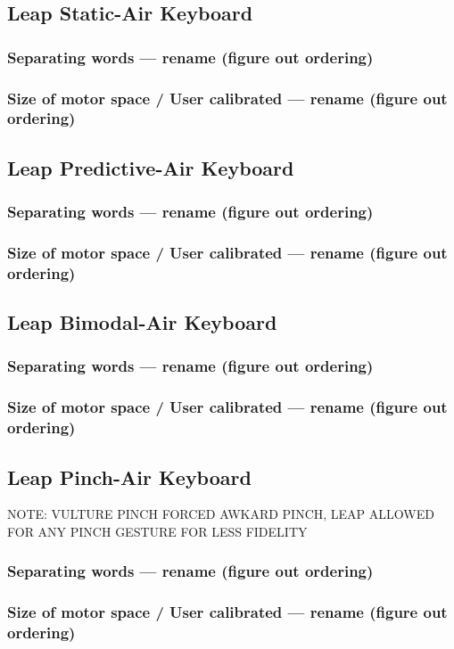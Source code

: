 \subsection{Leap Static-Air Keyboard}

\subsubsection{Separating words --- rename (figure out ordering)}

\subsubsection{Size of motor space / User calibrated --- rename (figure out ordering)}




\subsection{Leap Predictive-Air Keyboard}

\subsubsection{Separating words --- rename (figure out ordering)}

\subsubsection{Size of motor space / User calibrated --- rename (figure out ordering)}




\subsection{Leap Bimodal-Air Keyboard}

\subsubsection{Separating words --- rename (figure out ordering)}

\subsubsection{Size of motor space / User calibrated --- rename (figure out ordering)}





\subsection{Leap Pinch-Air Keyboard}

NOTE: VULTURE PINCH FORCED AWKARD PINCH, LEAP ALLOWED FOR ANY PINCH GESTURE FOR LESS FIDELITY



\subsubsection{Separating words --- rename (figure out ordering)}

\subsubsection{Size of motor space / User calibrated --- rename (figure out ordering)}
